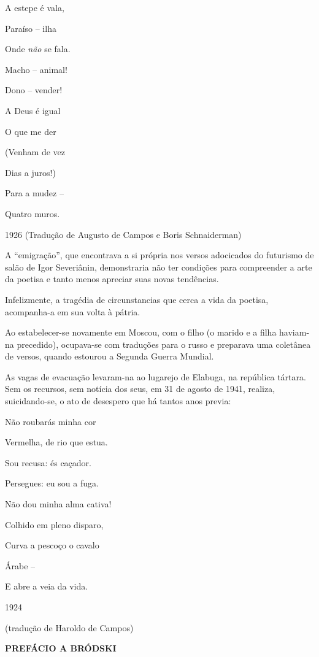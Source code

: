 A estepe é vala,

Paraíso -- ilha

Onde \emph{não} se fala.

Macho -- animal!

Dono -- vender!

A Deus é igual

O que me der

(Venham de vez

Dias a juros!)

Para a mudez --

Quatro muros.

1926 (Tradução de Augusto de Campos e Boris Schnaiderman)

A ``emigração'', que encontrava a si própria nos versos adocicados do
futurismo de salão de Igor Severiânin, demonstraria não ter condições
para compreender a arte da poetisa e tanto menos apreciar suas novas
tendências.

Infelizmente, a tragédia de circunstancias que cerca a vida da poetisa,
acompanha-a em sua volta à pátria.

Ao estabelecer-se novamente em Moscou, com o filho (o marido e a filha
haviam-na precedido), ocupava-se com traduções para o russo e preparava
uma coletânea de versos, quando estourou a Segunda Guerra Mundial.

As vagas de evacuação levaram-na ao lugarejo de Elabuga, na república
tártara. Sem os recursos, sem notícia dos seus, em 31 de agosto de 1941,
realiza, suicidando-se, o ato de desespero que há tantos anos previa:

Não roubarás minha cor

Vermelha, de rio que estua.

Sou recusa: és caçador.

Persegues: eu sou a fuga.

Não dou minha alma cativa!

Colhido em pleno disparo,

Curva a pescoço o cavalo

Árabe --

E abre a veia da vida.

1924

(tradução de Haroldo de Campos)

\textbf{PREFÁCIO A BRÓDSKI}

